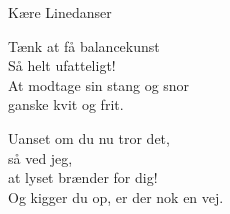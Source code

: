\begin{song}{Kære Linedanser}
\begin{SBVerse}
  Tænk at få balancekunst \\
  Så helt ufatteligt! \\
  At modtage sin stang og snor \\
  ganske kvit og frit. \\ \medskip

  Uanset om du nu tror det,  \\
  så ved jeg, \\
  at lyset brænder for dig! \\
  Og kigger du op, er der nok en vej. \\
  \end{SBVerse}

\end{song}